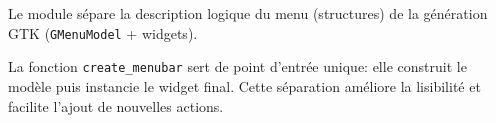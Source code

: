 Le module sépare la description logique du menu (structures) de la génération GTK (\texttt{GMenuModel} + widgets).

La fonction \texttt{create\_menubar} sert de point d'entrée unique: elle construit le modèle puis instancie le widget final. Cette séparation améliore la lisibilité et facilite l'ajout de nouvelles actions.

\newpage
